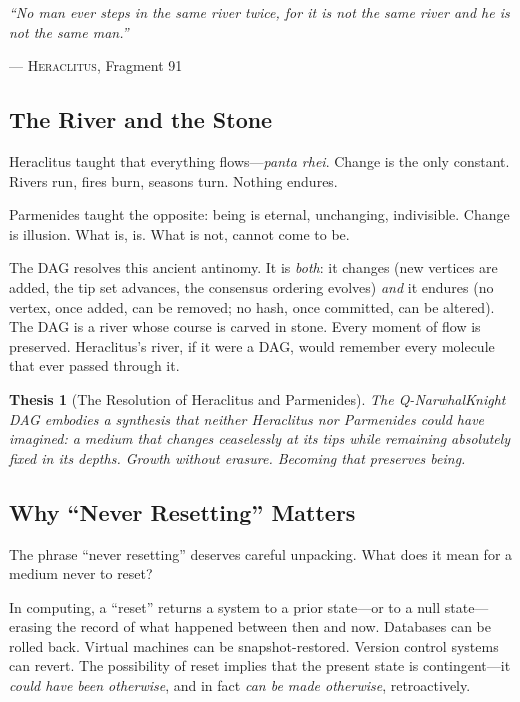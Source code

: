 \documentclass[12pt,a4paper]{article}
\theoremstyle{philosophical}
\newtheorem{thesis}{Thesis}
\begin{document}
\epigraph{\textit{``No man ever steps in the same river twice, for it is not the same river and he is not the same man.''}}{\textsc{--- Heraclitus}, Fragment 91}

\subsection{The River and the Stone}

Heraclitus taught that everything flows---\emph{panta rhei}. Change is the only constant. Rivers run, fires burn, seasons turn. Nothing endures.

Parmenides taught the opposite: being is eternal, unchanging, indivisible. Change is illusion. What is, is. What is not, cannot come to be.

The DAG resolves this ancient antinomy. It is \emph{both}: it changes (new vertices are added, the tip set advances, the consensus ordering evolves) \emph{and} it endures (no vertex, once added, can be removed; no hash, once committed, can be altered). The DAG is a river whose course is carved in stone. Every moment of flow is preserved. Heraclitus's river, if it were a DAG, would remember every molecule that ever passed through it.

\begin{thesis}[The Resolution of Heraclitus and Parmenides]
\label{thesis:heraclitus}
The Q-NarwhalKnight DAG embodies a synthesis that neither Heraclitus nor Parmenides could have imagined: a medium that changes ceaselessly at its tips while remaining absolutely fixed in its depths. Growth without erasure. Becoming that preserves being.
\end{thesis}

\subsection{Why ``Never Resetting'' Matters}

The phrase ``never resetting'' deserves careful unpacking. What does it mean for a medium never to reset?

In computing, a ``reset'' returns a system to a prior state---or to a null state---erasing the record of what happened between then and now. Databases can be rolled back. Virtual machines can be snapshot-restored. Version control systems can revert. The possibility of reset implies that the present state is contingent---it \emph{could have been otherwise}, and in fact \emph{can be made otherwise}, retroactively.
\end{document}

